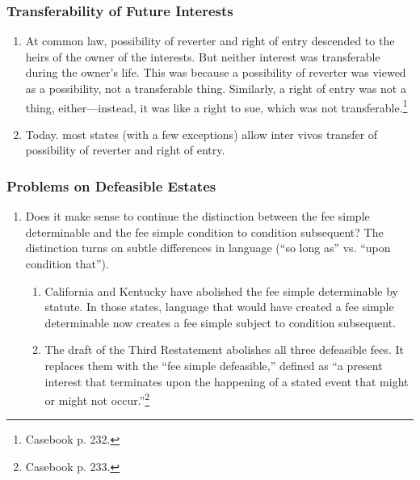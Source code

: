 \subsubsection{Transferability of Future Interests}

\begin{enumerate}
    \item At common law, possibility of reverter and right of entry descended 
    to the heirs of the owner of the interests. But neither interest was 
    transferable during the owner's life. This was because a possibility of 
    reverter was viewed as a possibility, not a transferable thing. Similarly, 
    a right of entry was not a thing, either---instead, it was like a right to 
    sue, which was not transferable.\footnote{Casebook p. 232.}
    \item Today. most states (with a few exceptions) allow inter vivos 
    transfer of possibility of reverter and right of entry.
\end{enumerate}

\subsubsection{Problems on Defeasible Estates}

\begin{enumerate}
    \item Does it make sense to continue the distinction between the fee 
    simple determinable and the fee simple condition to condition subsequent? 
    The distinction turns on subtle differences in language (``so long as'' 
    vs. ``upon condition that'').
    \begin{enumerate}
        \item California and Kentucky have abolished the fee simple 
        determinable by statute. In those states, language that would have 
        created a fee simple determinable now creates a fee simple subject to 
        condition subsequent.
        \item The draft of the Third Restatement abolishes all three 
        defeasible fees. It replaces them with the ``fee simple defeasible,'' 
        defined as ``a present interest that terminates upon the happening of 
        a stated event that might or might not occur.''\footnote{Casebook p. 
        233.}
    \end{enumerate}
\end{enumerate}

